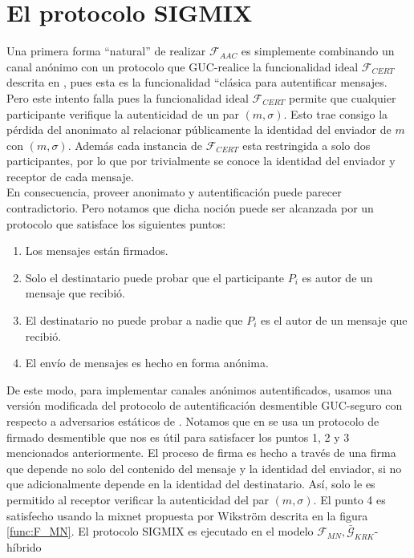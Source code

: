 \section{El protocolo SIGMIX}

Una primera forma ``natural'' de realizar $\mathcal{F}_{AAC}$ es simplemente combinando un canal anónimo
con un protocolo que GUC-realice la funcionalidad ideal $\mathcal{F}_{CERT}$ descrita en
\cite{conf/csfw/Canetti04}, pues esta es la funcionalidad ``cl\'asica para autentificar mensajes.
Pero este intento falla pues la funcionalidad ideal $\mathcal{F}_{CERT}$ permite que cualquier participante
verifique la autenticidad de un par $(m, \sigma)$. Esto trae consigo la pérdida del anonimato al relacionar
públicamente la identidad del enviador de $m$ con $(m, \sigma)$. Además cada instancia de $\mathcal{F}_{CERT}$
esta restringida a solo dos participantes, por lo que por trivialmente se conoce la identidad del enviador y
receptor de cada mensaje.\\
En consecuencia, proveer anonimato y autentificación puede parecer contradictorio. Pero notamos
que dicha noción puede ser alcanzada por un protocolo que satisface los siguientes puntos:
\begin{enumerate}
    \item Los mensajes están firmados.
    \item Solo el destinatario puede probar que el participante $P_i$ es autor de un mensaje que recibió.
    \item El destinatario no puede probar a nadie que $P_i$ es el autor de un mensaje que recibió.
    \item El envío de mensajes es hecho en forma anónima.
\end{enumerate}
De este modo, para implementar canales anónimos autentificados, usamos una versión modificada del protocolo de
autentificación desmentible GUC-seguro con respecto a adversarios estáticos de \cite{conf/tcc/DodisKSW09}. Notamos
que en \cite{conf/tcc/DodisKSW09} se usa un protocolo de firmado desmentible que nos es útil para satisfacer
los puntos 1, 2 y 3 mencionados anteriormente. El proceso de firma es hecho a través de una
firma que depende no solo del contenido del mensaje y la identidad del enviador, si no que adicionalmente depende
en la identidad del destinatario. Así, solo le es permitido al receptor verificar la autenticidad del par
$(m, \sigma)$. El punto 4 es satisfecho usando la mixnet propuesta por Wikstr\"om descrita en la figura
\ref{func:F_MN}.
El protocolo SIGMIX es ejecutado en el modelo $\mathcal{F}_{MN},\bar{\mathcal{G}}_{KRK}$-híbrido
